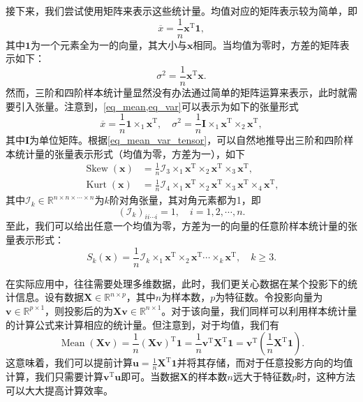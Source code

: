 接下来，我们尝试使用矩阵来表示这些统计量。均值对应的矩阵表示较为简单，即
\begin{equation} \label{eq_mean}
    \overline{x} = \frac{1}{n} \bm{x}^{\mathrm{T}} \bm{1},
\end{equation}
其中\( \bm{1} \)为一个元素全为一的向量，其大小与\( \bm{x} \)相同。当均值为零时，方差的矩阵表示如下：
\begin{equation} \label{eq_var}
    \sigma^2 = \frac{1}{n} \bm{x}^{\mathrm{T}} \bm{x}.
\end{equation}
然而，三阶和四阶样本统计量显然没有办法通过简单的矩阵运算来表示，此时就需要引入张量。注意到，\cref{eq_mean,eq_var}可以表示为如下的张量形式
\begin{equation} \label{eq_mean_var_tensor}
    \overline{x} = \frac{1}{n} \bm{1} \times_1 \bm{x}^{\mathrm{T}}, \quad \sigma^2 = \frac{1}{n} \mathbf{I} \times_1 \bm{x}^{\mathrm{T}} \times_2 \bm{x}^{\mathrm{T}},
\end{equation}
其中\( \mathbf{I} \)为单位矩阵。根据\cref{eq_mean_var_tensor}，可以自然地推导出三阶和四阶样本统计量的张量表示形式（均值为零，方差为一），如下
\begin{equation}
    \begin{split}
        \operatorname{Skew}(\bm{x}) & = \frac{1}{n} \mathcal{I}_3 \times_1 \bm{x}^{\mathrm{T}} \times_2 \bm{x}^{\mathrm{T}} \times_3 \bm{x}^{\mathrm{T}},                              \\
        \operatorname{Kurt}(\bm{x}) & = \frac{1}{n} \mathcal{I}_4 \times_1 \bm{x}^{\mathrm{T}} \times_2 \bm{x}^{\mathrm{T}} \times_3 \bm{x}^{\mathrm{T}} \times_4 \bm{x}^{\mathrm{T}},
    \end{split}
\end{equation}
其中\( \mathcal{I}_k \in \mathbb{R}^{n \times n \times \cdots \times n} \)为\( k \)阶对角张量，其对角元素都为1，即
\[
    (\mathcal{I}_k)_{i i \cdots i} = 1,\quad i = 1, 2, \cdots, n.
\]
至此，我们可以给出任意一个均值为零，方差为一的向量的任意阶样本统计量的张量表示形式：
\begin{equation}
    S_k(\bm{x}) = \frac{1}{n} \mathcal{I}_k \times_1 \bm{x}^{\mathrm{T}} \times_2 \bm{x}^{\mathrm{T}} \cdots \times_k \bm{x}^{\mathrm{T}}, \quad k \geq 3.
\end{equation}

在实际应用中，往往需要处理多维数据，此时，我们更关心数据在某个投影下的统计信息。设有数据\( \mathbf{X} \in \mathbb{R}^{n \times p} \)，其中\( n \)为样本数，\( p \)为特征数。令投影向量为\( \bm{v} \in \mathbb{R}^{p \times 1} \)，则投影后的为\( \mathbf{X} \bm{v} \in \mathbb{R}^{n \times 1} \)。对于该向量，我们同样可以利用样本统计量的计算公式来计算相应的统计量。但注意到，对于均值，我们有
\[
    \operatorname{Mean}(\mathbf{X} \bm{v}) = \frac{1}{n} \left( \mathbf{X} \bm{v} \right)^{\mathrm{T}} \bm{1} = \frac{1}{n} \bm{v}^{\mathrm{T}} \mathbf{X}^{\mathrm{T}} \bm{1} = \bm{v}^{\mathrm{T}} \left( \frac{1}{n} \mathbf{X}^{\mathrm{T}} \bm{1} \right).
\]
这意味着，我们可以提前计算\(\bm{u} =  \frac{1}{n} \mathbf{X}^{\mathrm{T}} \bm{1}\)并将其存储，而对于任意投影方向的均值计算，我们只需要计算\( \bm{v}^{\mathrm{T}} \bm{u} \)即可。当数据\( \mathbf{X} \)的样本数\( n \)远大于特征数\( p \)时，这种方法可以大大提高计算效率。


